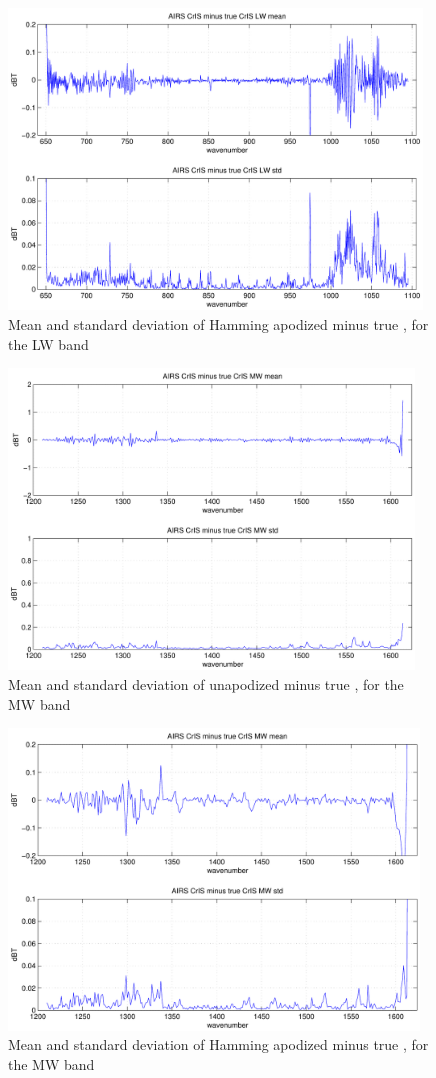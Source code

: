\documentclass[12pt]{article}
\begin{document}
\begin{figure}
  \centering
  \includegraphics[height=8cm]{figures/airs_cris_diff_LW_hamm.pdf}
  \caption{Mean and standard deviation of Hamming apodized {\airs}
      {\cris} minus true {\cris}, for the {\cris} LW band }
  \label{aclwdh}
\end{figure}

\begin{figure}
  \centering
  \includegraphics[height=8cm]{figures/airs_cris_diff_MW_noap.pdf}
  \caption{Mean and standard deviation of unapodized {\airs} {\cris}
    minus true {\cris}, for the {\cris} MW band }
  \label{acmwd}
\end{figure}

\begin{figure}
  \centering
  \includegraphics[height=8cm]{figures/airs_cris_diff_MW_hamm.pdf}
  \caption{Mean and standard deviation of Hamming apodized {\airs}
      {\cris} minus true {\cris}, for the {\cris} MW band }
  \label{acmwdh}
\end{figure}
\end{document}
